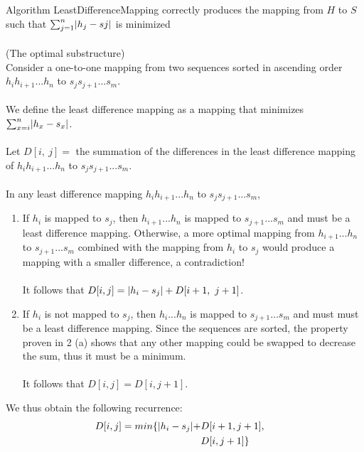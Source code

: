 \documentclass[12pt]{article}
\newenvironment{lemma}[2][Lemma]{\begin{trivlist}
\item[\hskip \labelsep {\bfseries #1}\hskip \labelsep {\bfseries #2.}]}{\end{trivlist}}
\newenvironment{question}[2][Question]{\begin{trivlist}
\item[\hskip \labelsep {\bfseries #1}\hskip \labelsep {\bfseries #2.}]}{\end{trivlist}}
\DeclarePairedDelimiter\abs{\lvert}{\rvert}%
\begin{document}
\begin{question}{2 (b)}
  \begin{lemma}{2.1} Algorithm LeastDifferenceMapping correctly produces the mapping from $H$ to $S$ such that $\sum_{j=1}^{n} \abs{h_{j} - s{j}}$ is minimized
    \leavevmode \\ \\
    (The optimal substructure) \\
    Consider a one-to-one mapping from two sequences sorted in ascending order\\
    $h_{i}h_{i+1}...h_{n}$ to $s_{j}s_{j+1}...s_{m}$. \\ \\
    We define the least difference mapping as a mapping that minimizes $\sum_{x=i}^{n} \abs{h_{x} - s_{x}}$. \\ \\
    Let $D[i,\ j] = $ the summation of the differences in the least difference mapping of
    $h_{i}h_{i+1}...h_{n}$ to $s_{j}s_{j+1}...s_{m}$. \\ \\
    In any least difference mapping $h_{i}h_{i+1}...h_{n}$ to $s_{j}s_{j+1}...s_{m}$,
    \begin{enumerate}
      \item If $h_{i}$ is mapped to $s_{j}$, then $h_{i+1}...h_{n}$ is mapped to
        $s_{j+1}...s_{m}$ and must be a least difference mapping.  Otherwise,
        a more optimal mapping from $h_{i+1}...h_{n}$ to $s_{j+1}...s_{m}$ combined
        with the mapping from $h_{i}$ to $s_{j}$ would produce a mapping with a
        smaller difference, a contradiction! \\ \\
        It follows that $D[i, j] = \abs{h_{i} - s_{j}} + D[i + 1,\ j + 1]$.

      \item If $h_{i}$ is not mapped to $s_{j}$, then $h_{i}...h_{n}$ is mapped
        to $s_{j+1}...s_{m}$ and must must be a least difference mapping.  Since
        the sequences are sorted, the property proven in 2 (a) shows that any other
        mapping could be swapped to decrease the sum, thus it must be a minimum. \\ \\
        It follows that $D[i, j] = D[i, j + 1]$.
    \end{enumerate}

    We thus obtain the following recurrence:
    \begin{align*}
      D[i, j] = min\{\abs{h_{i} - s_{j}} + & D[i + 1, j + 1], & \\
                                           & D[i, j + 1]\}
    \end{align*}


\end{lemma}
\end{question}
\end{document}
